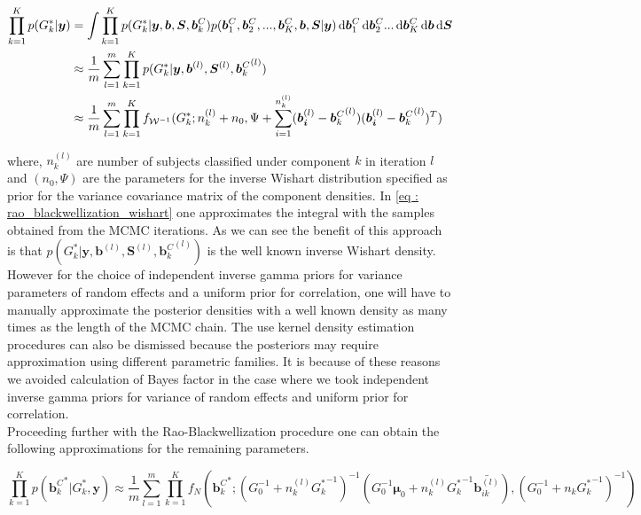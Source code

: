 \begin{equation}
\label{eq : rao_blackwellization_wishart}
\begin{split}
\prod_{k=1}^K p(G_k^*|\boldsymbol{y}) & = \int \prod_{k=1}^{K} p(G_k^*| \boldsymbol{y}, \boldsymbol{b}, \boldsymbol{S}, \boldsymbol{b}_k^C) p(\boldsymbol{b}_1^C, \boldsymbol{b}_2^C,..., \boldsymbol{b}_K^C,\boldsymbol{b}, \boldsymbol{S}|\boldsymbol{y}) 
\mathop{}\!\mathrm{d}{\boldsymbol{b}_1^C} \mathop{}\!\mathrm{d}{\boldsymbol{b}_2^C} ... \mathop{}\!\mathrm{d}{\boldsymbol{b}_K^C} \mathop{}\!\mathrm{d}{\boldsymbol{b}} \mathop{}\!\mathrm{d}{\boldsymbol{S}}\\
& \approx \frac 1 m \sum_{l=1}^m \prod_{k=1}^{K} p(G_k^*| \boldsymbol{y}, \boldsymbol{b}^{(l)}, \boldsymbol{S}^{(l)}, {\boldsymbol{b}_k^C}^{(l)
})\\
& \approx \frac 1 m \sum_{l=1}^m \prod_{k=1}^{K} f_{\mathcal{W}^{-1}}(G_k^*; n_k^{(l)}+n_0, \Psi + \sum_{i=1}^{n_k^{(l)}}(\boldsymbol{b_i}^{(l)} - {\boldsymbol{b}_k^C}^{(l)})(\boldsymbol{b_i}^{(l)} - {\boldsymbol{b}_k^C}^{(l)})^T)
\end{split}
\end{equation}

where, $n_k^{(l)}$ are number of subjects classified under component $k$ in iteration $l$ and $(n_0, \Psi)$ are the parameters for the inverse Wishart distribution specified as prior for the variance covariance matrix of the component densities. In \ref{eq : rao_blackwellization_wishart} one approximates the integral with the samples obtained from the MCMC iterations. As we can see the benefit of this approach is that $p(G_k^*| \boldsymbol{y}, \boldsymbol{b}^{(l)}, \boldsymbol{S}^{(l)}, {\boldsymbol{b}_k^C}^{(l)})$ is the well known inverse Wishart density. However for the choice of independent inverse gamma priors for variance parameters of random effects and a uniform prior for correlation, one will have to manually approximate the posterior densities with a well known density as many times as the length of the MCMC chain. The use kernel density estimation procedures can also be dismissed because the posteriors may require approximation using different parametric families. It is because of these reasons we avoided calculation of Bayes factor in the case where we took independent inverse gamma priors for variance of random effects and uniform prior for correlation.\\

Proceeding further with the Rao-Blackwellization procedure one can obtain the following approximations for the remaining parameters.

\begin{equation}
\prod_{k=1}^K p({\boldsymbol{b}_k^C}^*|G_k^*, \boldsymbol{y}) \approx 
\frac 1 m \sum_{l=1}^m \prod_{k=1}^{K} f_N({\boldsymbol{b}_k^C}^*; (G_0^{-1} + n_k^{(l)} {G_k^*}^{-1})^{-1} (G_0^{-1}\boldsymbol{\mu}_0 + n_k^{(l)} {G_k^*}^{-1} \bar{\boldsymbol{b}_{ik}^{(l)}}) , (G_0^{-1} + n_k {G_k^*}^{-1})^{-1})
\end{equation}

